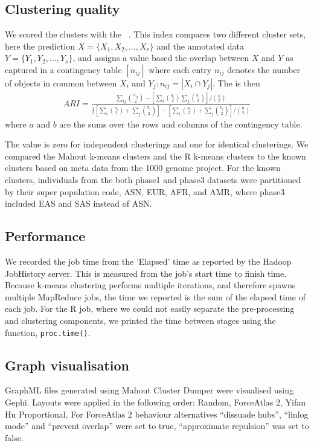 \documentclass{bioinfo}
\begin{document}
\begin{methods}
\subsection*{Clustering quality}
We scored the clusters with the \ARI{}~\citep{Hubert1985}. 
This index compares two different cluster sets, here the prediction $X = \{ X_1, X_2, \ldots , X_r \}$ and the annotated data $Y = \{ Y_1, Y_2, \ldots , Y_s \}$, and assigns a value based the overlap between $X$ and $Y$ as captured in a contingency table $\left[n_{ij}\right]$ where each entry $n_{ij}$ denotes the number of objects in common between $X_i$ and $Y_j : n_{ij}=|X_i \cap Y_j|$. 
The \ARI{} is then 
{\tiny
\begin{eqnarray*}
ARI=\frac{\sum_{ij}{{n_{ij}\choose 2}} - \left[ \sum_{i}{{a_i\choose2}} \sum_{j}{{b_i\choose2}} \right] / {n\choose2}}{\frac{1}{2} \left[ \sum_{i}{{a_{i}\choose 2} + \sum_{j}{{b_{j}\choose 2}}} \right] - \left[ \sum_{i}{{a_{i}\choose 2} + \sum_{j}{{b_{j}\choose 2}}} \right] / {n\choose2}} 
\end{eqnarray*}
}
where $a$ and $b$ are the sums over the rows and columns of the contingency table.

The value is zero for independent clusterings and one for identical clusterings. 
We compared the Mahout k-means clusters and the R k-means clusters to the known clusters based on meta data from the 1000 genome project.
For the known clusters, individuals from the both phase1 and phase3 datasets were partitioned by their super population code, ASN, EUR, AFR, and AMR, where phase3 included EAS and SAS instead of ASN.



\subsection*{Performance}
We recorded the job time from the 'Elapsed' time as reported by the Hadoop JobHistory server. This is measured from the job's start time to finish time.
Because k-means clustering performs multiple iterations, and therefore spawns multiple MapReduce jobs, the time we reported is the sum of the elapsed time of each job.
For the R job, where we could not easily separate the pre-processing and clustering components, we printed the time between
stages using the function, \texttt{proc.time()}.


\subsection*{Graph visualisation}
GraphML files generated using Mahout Cluster Dumper were visualised using Gephi. Layouts were applied in the following order: Random, ForceAtlas 2, Yifan Hu Proportional. For ForceAtlas 2 behaviour alternatives ``dissuade hubs'', ``linlog mode'' and ``prevent overlap'' were set to true, ``approximate repulsion'' was set to false.


\end{methods}
\end{document}
